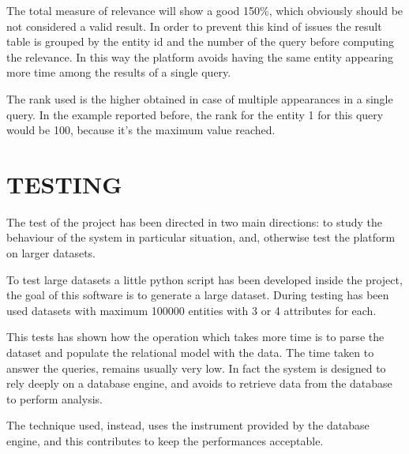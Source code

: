 \documentclass{acm_proc_article-sp-sigmod07}
\begin{document}
The total measure of relevance will show a good 150\%, which obviously
should be not considered a valid result.
In order to prevent this kind of issues the result table is grouped by the
entity id and the number of the query before computing the relevance.
In this way the platform avoids having the same entity appearing more time
among the results of a single query.

The rank used is the higher obtained in case of multiple appearances in a
single query.
In the example reported before, the rank for the entity 1 for this query
would be 100, because it's the maximum value reached.

\section{TESTING}
The test of the project has been directed in two main directions: to study
the behaviour of the system in particular situation, and, otherwise test
the platform on larger datasets.

To test large datasets a little python script has been developed inside
the project, the goal of this software is to generate a large dataset.
During testing has been used datasets with maximum 100000 entities with 3
or 4 attributes for each.

This tests has shown how the operation which takes more time is to parse
the dataset and populate the relational model with the data. The time
taken to answer the queries, remains usually very low.
In fact the system is designed to rely deeply on a database engine, and
avoids to retrieve data from the database to perform analysis.

The technique used, instead, uses the instrument provided by the database
engine, and this contributes to keep the performances acceptable.








\end{document}
